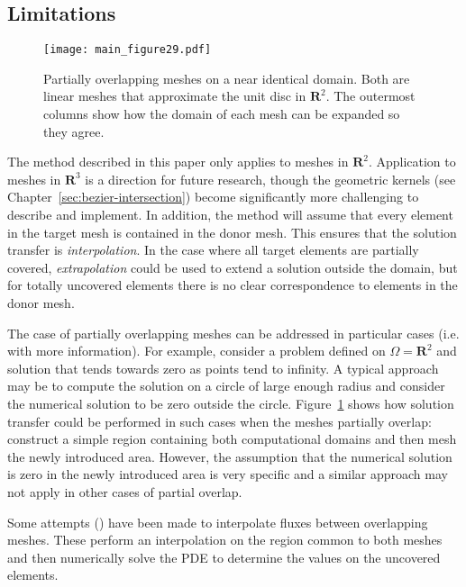 \documentclass[letterpaper,10pt]{article}
\theoremstyle{definition}
\newcommand{\reals}{\mathbf{R}}
\begin{document}
\subsection{Limitations}

\begin{figure}
  \texttt{[image: main\_figure29.pdf]}
  \centering
  \captionsetup{width=.75\linewidth}
  \caption{Partially overlapping meshes on a near identical domain. Both are
    linear meshes that approximate the unit disc in \(\reals^2\). The outermost
    columns show how the domain of each mesh can be expanded so they agree.}
  \label{fig:partially-overlapping}
\end{figure}

The method described in this paper only applies to meshes in \(\reals^2\).
Application to meshes in \(\reals^3\) is a direction for future research,
though the geometric kernels (see Chapter~\ref{sec:bezier-intersection})
become significantly more challenging to describe and implement. In
addition, the method will assume that every element in the
target mesh is contained in the donor mesh. This ensures that the solution
transfer is \emph{interpolation}. In the case where all target elements are
partially covered, \emph{extrapolation} could be used to extend a solution
outside the domain, but for totally uncovered elements there is no clear
correspondence to elements in the donor mesh.

The case of partially overlapping meshes can be addressed in particular
cases (i.e. with more information). For example, consider a problem
defined on \(\Omega = \reals^2\) and solution
that tends towards zero as points tend to infinity. A typical approach
may be to compute the solution on a circle of large enough radius and
consider the numerical solution to be zero outside the circle.
Figure~\ref{fig:partially-overlapping} shows how solution transfer could be
performed in such cases when the meshes partially overlap: construct a
simple region containing both computational domains and then mesh the
newly introduced area. However, the assumption that the numerical solution
is zero in the newly introduced area is very specific and
a similar approach may not apply in other cases of partial overlap.

Some attempts (\cite{Berger1987, Chesshire1994, Cai1999}) have been
made to interpolate fluxes between overlapping meshes. These perform
an interpolation on the region common to both meshes and then numerically
solve the PDE to determine the values on the uncovered elements.
\end{document}
